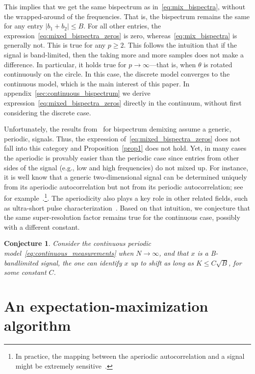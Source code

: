 \documentclass[english,12pt]{article}
\newcommand{\TODO}[1]{{\color{red}{[#1]}}}
\numberwithin{equation}{section}
\numberwithin{thm}{section} %
\newtheorem{conj}[thm]{Conjecture}
\begin{document}
This implies that we get the same bispectrum as in~\eqref{eq:mix_bispectra}, without the wrapped-around of the frequencies. 
That is, the bispectrum remains the same for any entry $\vert b_1 + b_2\vert \leq B$. For all other entries, the expression~\eqref{eq:mixed_bispectra_zeros} is zero, whereas~\eqref{eq:mix_bispectra} is generally not. 
This is true for any $p\geq 2$. 
This follows the intuition that if the signal is band-limited, then the taking more and more samples does not make a difference. \TODO{Does it?} 
In particular, it holds true for $p\to\infty$---that is, when $\theta$ is rotated continuously on the circle. In this case, the discrete model converges to the continuous model, which is the main interest of this paper. In appendix~\ref{sec:continuous_bispectrum} we derive expression~\eqref{eq:mixed_bispectra_zeros} directly in the continuum, without first considering the discrete case. 

Unfortunately, the results from~\cite{bandeira2017estimation} for bispectrum demixing assume a generic, periodic, signals. Thus, the expression of~\eqref{eq:mixed_bispectra_zeros} does not fall into this category and Proposition~\ref{prop1} does not hold. Yet, in many cases the aperiodic is provably easier than the periodic case since entries from other sides of the signal (e.g.,
low and high frequencies) do not mixed up. 
For instance, it is well know that a generic two-dimensional signal can be determined uniquely from its aperiodic autocorrelation but not from its periodic autocorrelation; see for example~\cite{hayes1982reconstruction}.\footnote{In practice, the mapping between the aperiodic autocorrelation and a signal might be extremely sensitive~\cite{barnett2018geometry}.}. The aperiodicity also plays a key role in other related fields, such as ultra-short pulse characterization~\cite{bendory2018signal}. 
Based on that intuition, we conjecture that the same super-resolution factor remains true for the continuous case, possibly with a different constant. 

\begin{conj} \label{conj:continuous}
Consider the  continuous periodic model~\eqref{eq:continuous_measurements} when $N\to\infty$, and that $x$ is a B-bandlimited signal, the  one can identify $x$ up to shift as long as $K\leq C \sqrt{B}$, for some constant $C$.
\end{conj}

\section{An expectation-maximization algorithm }
\label{sec:EM}
\end{document}

